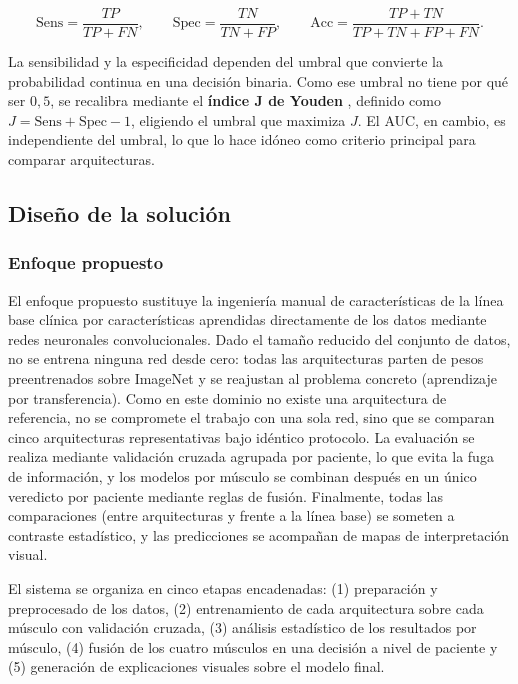 \documentclass[12pt]{extarticle}
\numberwithin{equation}{section}
\begin{document}
\begin{refsection}
\begin{equation}
\text{Sens} = \frac{TP}{TP + FN}, \qquad
\text{Spec} = \frac{TN}{TN + FP}, \qquad
\text{Acc} = \frac{TP + TN}{TP + TN + FP + FN}.
\end{equation}

La sensibilidad y la especificidad dependen del umbral que convierte la probabilidad continua en una decisión binaria. Como ese umbral no tiene por qué ser $0{,}5$, se recalibra mediante el \textbf{índice J de Youden} \cite{youden1950index}, definido como $J = \text{Sens} + \text{Spec} - 1$, eligiendo el umbral que maximiza $J$. El AUC, en cambio, es independiente del umbral, lo que lo hace idóneo como criterio principal para comparar arquitecturas.

\subsection{Diseño de la solución}\label{subsec:diseno}

\subsubsection{Enfoque propuesto}

El enfoque propuesto sustituye la ingeniería manual de características de la línea base clínica por características aprendidas directamente de los datos mediante redes neuronales convolucionales. Dado el tamaño reducido del conjunto de datos, no se entrena ninguna red desde cero: todas las arquitecturas parten de pesos preentrenados sobre ImageNet \cite{deng2009imagenet} y se reajustan al problema concreto (aprendizaje por transferencia). Como en este dominio no existe una arquitectura de referencia, no se compromete el trabajo con una sola red, sino que se comparan cinco arquitecturas representativas bajo idéntico protocolo. La evaluación se realiza mediante validación cruzada agrupada por paciente, lo que evita la fuga de información, y los modelos por músculo se combinan después en un único veredicto por paciente mediante reglas de fusión. Finalmente, todas las comparaciones (entre arquitecturas y frente a la línea base) se someten a contraste estadístico, y las predicciones se acompañan de mapas de interpretación visual.

El sistema se organiza en cinco etapas encadenadas: (1) preparación y preprocesado de los datos, (2) entrenamiento de cada arquitectura sobre cada músculo con validación cruzada, (3) análisis estadístico de los resultados por músculo, (4) fusión de los cuatro músculos en una decisión a nivel de paciente y (5) generación de explicaciones visuales sobre el modelo final.


\end{refsection}
\end{document}
